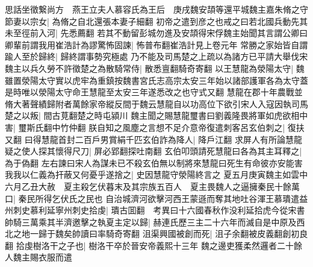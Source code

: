 思話坐徵繋尚方　燕王立夫人慕容氏為王后　庚戌魏安頡等還平城魏主嘉朱脩之守節妻以宗女|{
	為脩之自北還張本妻子細翻}
初帝之遣到彦之也戒之曰若北國兵動先其未至徑前入河|{
	先悉薦翻}
若其不動留彭城勿進及安頡得宋俘魏主始聞其言謂公卿曰卿輩前謂我用崔浩計為謬驚怖固諫|{
	怖普布翻崔浩計見上卷元年}
常勝之家始皆自謂踰人至於歸終|{
	歸終謂事勢究極處}
乃不能及司馬楚之上疏以為諸方已平請大舉伐宋魏主以兵久勞不許徵楚之為散騎常侍|{
	散悉亶翻騎奇寄翻}
以王慧龍為滎陽太守|{
	魏雖置滎陽太守實以虎牢為重鎮按魏書宮氏志高宗太安三年始以諸部護軍各為太守蓋是時唯以滎陽太守命王慧龍至太安三年遂悉改之也守式又翻}
慧龍在郡十年農戰並脩大著聲績歸附者萬餘家帝縱反間于魏云慧龍自以功高位下欲引宋人入寇因執司馬楚之以叛|{
	間古莧翻楚之時屯潁川}
魏主聞之賜慧龍璽書曰劉義隆畏將軍如虎欲相中害|{
	璽斯氏翻中竹仲翻}
朕自知之風塵之言想不足介意帝復遣刺客呂玄伯刺之|{
	復扶又翻}
曰得慧龍首封二百戶男賞絹千匹玄伯詐為降人|{
	降戶江翻}
求屏人有所論慧龍疑之使人探其懷得尺刀|{
	屏必郢翻探吐南翻}
玄伯叩頭請死慧龍曰各為其主耳釋之|{
	為于偽翻}
左右諫曰宋人為謀未已不殺玄伯無以制將來慧龍曰死生有命彼亦安能害我我以仁義為扞蔽又何憂乎遂捨之|{
	史因慧龍守滎陽終言之}
夏五月庚寅魏主如雲中　六月乙丑大赦　夏主殺乞伏暮末及其宗族五百人　夏主畏魏人之逼擁秦民十餘萬口|{
	秦民所得乞伏氏之民也}
自治城濟河欲擊河西王蒙遜而奪其地吐谷渾王慕璝遣益州刺史慕利延寧州刺史拾虔|{
	璝古囬翻　考異曰十六國春秋作没利延拾虎今從宋書}
帥騎三萬乘其半濟邀擊之執夏主定以歸|{
	赫連氏歷三主二十六年而滅自是中原及西北之地一歸于魏矣帥讀曰率騎奇寄翻}
沮渠興國被創而死|{
	沮子余翻被皮義翻創初良翻}
拾虔樹洛干之子也|{
	樹洛干卒於晉安帝義熙十三年}
魏之邊吏獲柔然邏者二十餘人魏主賜衣服而遣

